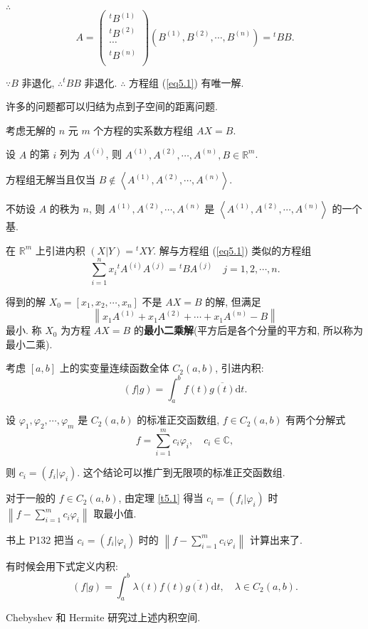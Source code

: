 \documentclass[color=black,device=normal,lang=cn,mode=geye]{elegantnote}
\begin{document}
$\therefore$
\[A=\begin{pmatrix}
    {}^tB^{(1)} \\
    {}^tB^{(2)} \\
    \cdots \\
    {}^tB^{(n)} \\
\end{pmatrix}(B^{(1)},B^{(2)},\cdots,B^{(n)})={}^tBB.\]

$\because B$ 非退化, $\therefore{}^tBB$ 非退化. $\therefore$ 方程组 (\ref{eq5.1}) 有唯一解.

许多的问题都可以归结为点到子空间的距离问题.
\begin{example}\label{exa5.1}
    考虑无解的 $n$ 元 $m$ 个方程的实系数方程组 $AX=B$.
    
    设 $A$ 的第 $i$ 列为 $A^{(i)}$, 则 $A^{(1)},A^{(2)},\cdots,A^{(n)},B\in\mathbb{R}^m$.
    
    方程组无解当且仅当 $B\notin\left<A^{(1)},A^{(2)},\cdots,A^{(n)}\right>$.
    
    不妨设 $A$ 的秩为 $n$, 则 $A^{(1)},A^{(2)},\cdots,A^{(n)}$ 是 $\left<A^{(1)},A^{(2)},\cdots,A^{(n)}\right>$ 的一个基.

    在 $\mathbb{R}^m$ 上引进内积 $(X|Y)={}^tXY$. 解与方程组 (\ref{eq5.1}) 类似的方程组
    \[\sum\limits_{i=1}^nx_i{}^tA^{(i)}A^{(j)}={}^tBA^{(j)}\quad j=1,2,\cdots,n.\]
    
    得到的解 $X_0=[x_1,x_2,\cdots,x_n]$ 不是 $AX=B$ 的解, 但满足
    \[\left\|x_1A^{(1)}+x_1A^{(2)}+\cdots+x_1A^{(n)}-B\right\|\]
    最小. 称 $X_0$ 为方程 $AX=B$ 的\textbf{最小二乘解}(平方后是各个分量的平方和, 所以称为最小二乘).
\end{example}
\begin{example}
    考虑 $[a,b]$ 上的实变量连续函数全体 $C_2(a,b)$, 引进内积:
    \[(f|g)=\int_a^bf(t)\overline{g(t)}\mathrm{d}t.\]
    
    设 $\varphi_1,\varphi_2,\cdots,\varphi_m$ 是 $C_2(a,b)$ 的标准正交函数组, $f\in C_2(a,b)$ 有两个分解式
    \[f=\sum\limits_{i=1}^mc_i\varphi_i,\quad c_i\in\mathbb{C},\]
    
    则 $c_i=(f_i|\varphi_i)$. 这个结论可以推广到无限项的标准正交函数组.

    对于一般的 $f\in C_2(a,b)$, 由定理 \ref{t5.1} 得当 $c_i=(f_i|\varphi_i)$ 时 $\left\|f-\sum\limits_{i=1}^mc_i\varphi_i\right\|$ 取最小值.

    书上 P132 把当 $c_i=(f_i|\varphi_i)$ 时的 $\left\|f-\sum\limits_{i=1}^mc_i\varphi_i\right\|$ 计算出来了.

    有时候会用下式定义内积:
    \[(f|g)=\int_a^b\lambda(t)f(t)\overline{g(t)}\mathrm{d}t,\quad\lambda\in C_2(a,b).\]

    Chebyshev 和 Hermite 研究过上述内积空间.
\end{example}
\end{document}
